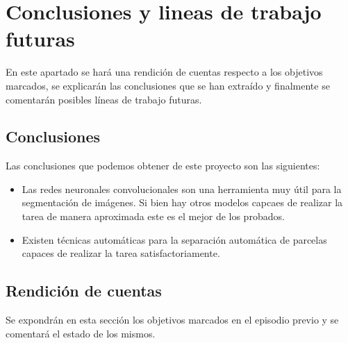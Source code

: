 \chapter{Conclusiones y lineas de trabajo futuras}
En este apartado se hará una rendición de cuentas respecto a los objetivos marcados, se explicarán las conclusiones que se han extraído y finalmente se comentarán posibles líneas de trabajo futuras.

\section{Conclusiones}
Las conclusiones que podemos obtener de este proyecto son las siguientes:

\begin{itemize}
	\item Las redes neuronales convolucionales son una herramienta muy útil para la segmentación de imágenes. Si bien hay otros modelos capcaes de realizar la tarea de manera aproximada este es el mejor de los probados.
	
	\item Existen técnicas automáticas para la separación automática de parcelas capaces de realizar la tarea satisfactoriamente.

\end{itemize}

\section{Rendición de cuentas}
Se expondrán en esta sección los objetivos marcados en el episodio previo y se comentará el estado de los mismos.

